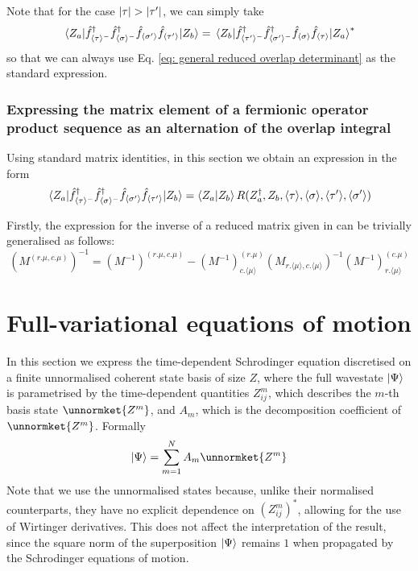\documentclass[12pt]{article}
\newcommand{\seq}[1]{\langle #1\rangle}
\newcommand{\hc}{^\dagger}
\begin{document}
	Note that for the case $\abs{\tau}>\abs{\tau'}$, we can simply take
	\begin{equation}
	\mel{Z_a}{\hat{f}\hc_{\seq{\tau}^-}\hat{f}\hc_{\seq{\sigma}^-}\hat{f}_{\seq{\sigma'}}\hat{f}_{\seq{\tau'}}}{Z_b}=\mel{Z_b}{\hat{f}\hc_{\seq{\tau'}^-}\hat{f}\hc_{\seq{\sigma'}^-}\hat{f}_{\seq{\sigma}}\hat{f}_{\seq{\tau}}}{Z_a}^*
	\end{equation}
	so that we can always use Eq. \ref{eq: general reduced overlap determinant} as the standard expression.
	
	\subsubsection{Expressing the matrix element of a fermionic operator product sequence as an alternation of the overlap integral}
	
	Using standard matrix identities, in this section we obtain an expression in the form
	\begin{equation}
	\mel{Z_a}{\hat{f}\hc_{\seq{\tau}^-}\hat{f}\hc_{\seq{\sigma}^-}\hat{f}_{\seq{\sigma'}}\hat{f}_{\seq{\tau'}}}{Z_b} = \braket{Z_a}{Z_b} R(Z_a\hc, Z_b, \seq{\tau}, \seq{\sigma}, \seq{\tau'}, \seq{\sigma'})
	\end{equation}
	
	Firstly, the expression for the inverse of a reduced matrix given in \cite{reverse_bordering} can be trivially generalised as follows:
	\begin{equation}
	(M^{(r.\mu, c.\mu)})^{-1}=(M^{-1})^{(r.\mu, c.\mu)}-(M^{-1})^{(r.\mu)}_{c.\seq{\mu}} (M_{r.\seq{\mu},c.\seq{\mu}})^{-1} (M^{-1})^{(c.\mu)}_{r.\seq{\mu}}
	\end{equation}
	
	\section{Full-variational equations of motion}
	In this section we express the time-dependent Schrodinger equation discretised on a finite unnormalised coherent state basis of size $Z$, where the full wavestate $\ket{\Psi}$ is parametrised by the time-dependent quantities $Z^m_{ij}$, which describes the $m$-th basis state $\unnormket{Z^m}$, and $A_m$, which is the decomposition coefficient of $\unnormket{Z^m}$. Formally
	\begin{equation}
	\ket{\Psi}=\sum_{m=1}^N A_m\unnormket{Z^m}
	\end{equation}
	Note that we use the unnormalised states because, unlike their normalised counterparts, they have no explicit dependence on $(Z^m_{ij})^*$, allowing for the use of Wirtinger derivatives. This does not affect the interpretation of the result, since the square norm of the superposition $\ket{\Psi}$ remains $1$ when propagated by the Schrodinger equations of motion.
	
\end{document}
